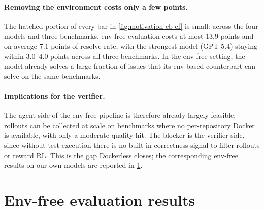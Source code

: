 \documentclass[]{arxiv_template}
\newcommand{\approach}{Dockerless\xspace}
\begin{document}
\paragraph{Removing the environment costs only a few points.}
The hatched portion of every bar in \cref{fig:motivation-eb-ef} is small: across the four models and three benchmarks, env-free evaluation costs at most $13.9$ points and on average $7.1$ points of resolve rate, with the strongest model (GPT-5.4) staying within $3.0$--$4.0$ points across all three benchmarks.
In the env-free setting, the model already solves a large fraction of issues that its env-based counterpart can solve on the same benchmarks.


\paragraph{Implications for the verifier.}
The agent side of the env-free pipeline is therefore already largely feasible: rollouts can be collected at scale on benchmarks where no per-repository Docker is available, with only a moderate quality hit.
The blocker is the verifier side, since without test execution there is no built-in correctness signal to filter rollouts or reward RL.
This is the gap \approach closes; the corresponding env-free results on our own models are reported in \cref{app:wo-env-eval}.


\section{Env-free evaluation results}
\label{app:wo-env-eval}
\end{document}
